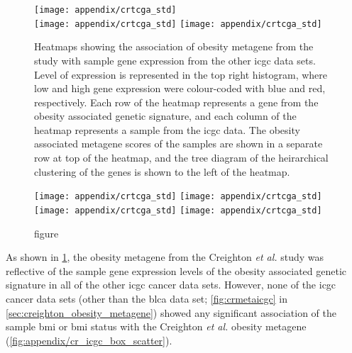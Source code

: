 \begin{appendices}
	\begin{figure}[htp!]
		\centering
		\texttt{[image: appendix/crtcga\_std]}\\
		\vspace{1em}
		\texttt{[image: appendix/crtcga\_std]}
		\hfill
		\texttt{[image: appendix/crtcga\_std]}\\
		\caption{Heatmaps showing the association of obesity metagene from the \citet{Creighton2012} study with sample gene expression from the other \gls{icgc} data sets.
	Level of expression is represented in the top right histogram, where low and high gene expression were colour-coded with blue and red, respectively.
	Each row of the heatmap represents a gene from the obesity associated genetic signature, and each column of the heatmap represents a sample from the \gls{icgc} data.
	The obesity associated metagene scores of the samples are shown in a separate row at top of the heatmap, and the tree diagram of the heirarchical clustering of the genes is shown to the left of the heatmap. }
		\label{fig:appendix/cr_icgc_heatmap}
	\end{figure}

	\begin{figure}[htpb]
		\ContinuedFloat
		\captionsetup{list=off,format=cont}
		\centering
		\texttt{[image: appendix/crtcga\_std]}
		\hfill
		\texttt{[image: appendix/crtcga\_std]}\\
		\vspace{1em}
		\texttt{[image: appendix/crtcga\_std]}
		\hfill
		\texttt{[image: appendix/crtcga\_std]}\\
		\vspace{1em}
		\caption{figure}
	\end{figure}

	\noindent
	As shown in \cref{fig:appendix/cr_icgc_heatmap}, the obesity metagene from the Creighton \textit{et al.} study was reflective of the sample gene expression levels of the obesity associated genetic signature in all of the other \gls{icgc} cancer data sets.
	However, none of the \gls{icgc} cancer data sets (other than the \gls{blca} data set; \cref{fig:crmetaicgc} in \cref{sec:creighton_obesity_metagene}) showed any significant association of the sample \gls{bmi} or \gls{bmi} status with the Creighton \textit{et al.} obesity metagene (\cref{fig:appendix/cr_icgc_box_scatter}).


\end{appendices}
